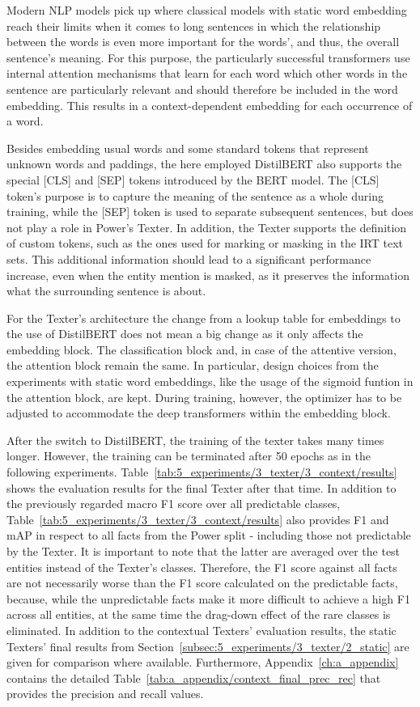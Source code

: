 Modern NLP models pick up where classical models with static word embedding reach their limits when it comes to long sentences in which the relationship between the words is even more important for the words', and thus, the overall sentence's meaning. For this purpose, the particularly successful transformers use internal attention mechanisms that learn for each word which other words in the sentence are particularly relevant and should therefore be included in the word embedding. This results in a context-dependent embedding for each occurrence of a word.

Besides embedding usual words and some standard tokens that represent unknown words and paddings, the here employed DistilBERT also supports the special [CLS] and [SEP] tokens introduced by the BERT model. The [CLS] token's purpose is to capture the meaning of the sentence as a whole during training, while the [SEP] token is used to separate subsequent sentences, but does not play a role in Power's Texter. In addition, the Texter supports the definition of custom tokens, such as the ones used for marking or masking in the IRT text sets. This additional information should lead to a significant performance increase, even when the entity mention is masked, as it preserves the information what the surrounding sentence is about.

For the Texter's architecture the change from a lookup table for embeddings to the use of DistilBERT does not mean a big change as it only affects the embedding block. The classification block and, in  case of the attentive version, the attention block remain the same. In particular, design choices from the experiments with static word embeddings, like the usage of the sigmoid funtion in the attention block, are kept. During training, however, the optimizer has to be adjusted to accommodate the deep transformers within the embedding block.

After the switch to DistilBERT, the training of the texter takes many times longer. However, the training can be terminated after 50 epochs as in the following experiments. Table~\ref{tab:5_experiments/3_texter/3_context/results} shows the evaluation results for the final Texter after that time. In addition to the previously regarded macro F1 score over all predictable classes, Table~\ref{tab:5_experiments/3_texter/3_context/results} also provides F1 and mAP in respect to all facts from the Power split - including those not predictable by the Texter. It is important to note that the latter are averaged over the test entities instead of the Texter's classes. Therefore, the F1 score against all facts are not necessarily worse than the F1 score calculated on the predictable facts, because, while the unpredictable facts make it more difficult to achieve a high F1 across all entities, at the same time the drag-down effect of the rare classes is eliminated. In addition to the contextual Texters' evaluation results, the static Texters' final results from Section~\ref{subsec:5_experiments/3_texter/2_static} are given for comparison where available. Furthermore, Appendix~\ref{ch:a_appendix} contains the detailed Table~\ref{tab:a_appendix/context_final_prec_rec} that provides the precision and recall values.

